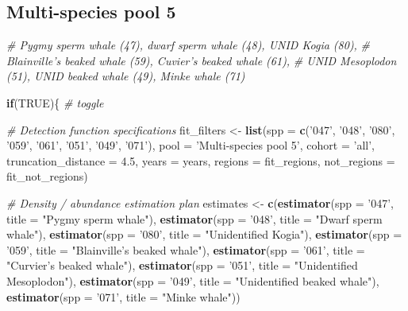\documentclass[
]{book}
\newenvironment{Shaded}{\begin{snugshade}}{\end{snugshade}}
\newcommand{\CommentTok}[1]{\textcolor[rgb]{0.56,0.35,0.01}{\textit{#1}}}
\newcommand{\ControlFlowTok}[1]{\textcolor[rgb]{0.13,0.29,0.53}{\textbf{#1}}}
\newcommand{\DataTypeTok}[1]{\textcolor[rgb]{0.13,0.29,0.53}{#1}}
\newcommand{\FloatTok}[1]{\textcolor[rgb]{0.00,0.00,0.81}{#1}}
\newcommand{\KeywordTok}[1]{\textcolor[rgb]{0.13,0.29,0.53}{\textbf{#1}}}
\newcommand{\NormalTok}[1]{#1}
\newcommand{\OtherTok}[1]{\textcolor[rgb]{0.56,0.35,0.01}{#1}}
\newcommand{\StringTok}[1]{\textcolor[rgb]{0.31,0.60,0.02}{#1}}
\begin{document}
\hypertarget{multi-species-pool-5-1}{%
\subsection*{Multi-species pool 5}\label{multi-species-pool-5-1}}

\begin{Shaded}
\begin{Highlighting}[]
\CommentTok{# Pygmy sperm whale (47), dwarf sperm whale (48), UNID Kogia (80),}
\CommentTok{# Blainville's beaked whale (59), Cuvier's beaked whale (61),}
\CommentTok{# UNID Mesoplodon (51), UNID beaked whale (49), Minke whale (71)}

\ControlFlowTok{if}\NormalTok{(}\OtherTok{TRUE}\NormalTok{)\{ }\CommentTok{# toggle}

  \CommentTok{# Detection function specifications}
\NormalTok{  fit_filters <-}
\StringTok{    }\KeywordTok{list}\NormalTok{(}\DataTypeTok{spp =} \KeywordTok{c}\NormalTok{(}\StringTok{'047'}\NormalTok{, }\StringTok{'048'}\NormalTok{, }\StringTok{'080'}\NormalTok{, }\StringTok{'059'}\NormalTok{, }\StringTok{'061'}\NormalTok{, }\StringTok{'051'}\NormalTok{, }\StringTok{'049'}\NormalTok{, }\StringTok{'071'}\NormalTok{),}
         \DataTypeTok{pool =} \StringTok{'Multi-species pool 5'}\NormalTok{,}
         \DataTypeTok{cohort =} \StringTok{'all'}\NormalTok{,}
         \DataTypeTok{truncation_distance =} \FloatTok{4.5}\NormalTok{,}
         \DataTypeTok{years =}\NormalTok{ years,}
         \DataTypeTok{regions =}\NormalTok{ fit_regions,}
         \DataTypeTok{not_regions =}\NormalTok{ fit_not_regions)}

  \CommentTok{# Density / abundance estimation plan}
\NormalTok{  estimates <-}
\StringTok{      }\KeywordTok{c}\NormalTok{(}\KeywordTok{estimator}\NormalTok{(}\DataTypeTok{spp =} \StringTok{'047'}\NormalTok{, }\DataTypeTok{title =} \StringTok{"Pygmy sperm whale"}\NormalTok{),}
        \KeywordTok{estimator}\NormalTok{(}\DataTypeTok{spp =} \StringTok{'048'}\NormalTok{, }\DataTypeTok{title =} \StringTok{"Dwarf sperm whale"}\NormalTok{),}
        \KeywordTok{estimator}\NormalTok{(}\DataTypeTok{spp =} \StringTok{'080'}\NormalTok{, }\DataTypeTok{title =} \StringTok{"Unidentified Kogia"}\NormalTok{),}
        \KeywordTok{estimator}\NormalTok{(}\DataTypeTok{spp =} \StringTok{'059'}\NormalTok{, }\DataTypeTok{title =} \StringTok{"Blainville's beaked whale"}\NormalTok{),}
        \KeywordTok{estimator}\NormalTok{(}\DataTypeTok{spp =} \StringTok{'061'}\NormalTok{, }\DataTypeTok{title =} \StringTok{"Curvier's beaked whale"}\NormalTok{),}
        \KeywordTok{estimator}\NormalTok{(}\DataTypeTok{spp =} \StringTok{'051'}\NormalTok{, }\DataTypeTok{title =} \StringTok{"Unidentified Mesoplodon"}\NormalTok{),}
        \KeywordTok{estimator}\NormalTok{(}\DataTypeTok{spp =} \StringTok{'049'}\NormalTok{, }\DataTypeTok{title =} \StringTok{"Unidentified beaked whale"}\NormalTok{),}
        \KeywordTok{estimator}\NormalTok{(}\DataTypeTok{spp =} \StringTok{'071'}\NormalTok{, }\DataTypeTok{title =} \StringTok{"Minke whale"}\NormalTok{))}


\end{Highlighting}
\end{Shaded}
\end{document}
